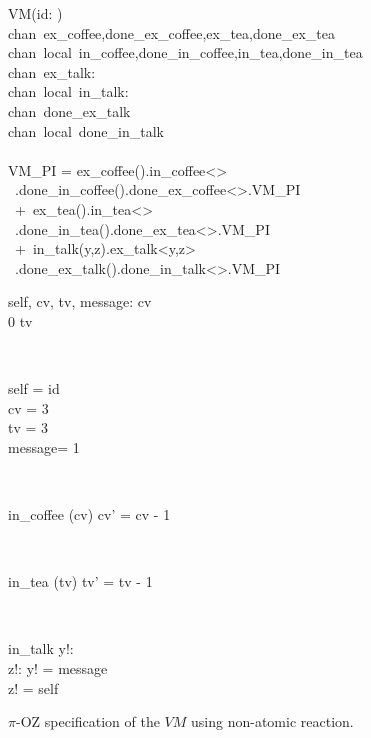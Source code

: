 \begin{figure}[H]
\centering
\begin{class}{VM(id: \integer)}
\ 
\\chan\ ex\_coffee,done\_ex\_coffee,ex\_tea,done\_ex\_tea
\ 
\\chan\ local\ in\_coffee,done\_in\_coffee,in\_tea,done\_in\_tea
\ 
\\chan\ ex\_talk:\integer \times \integer
\ 
\\chan\ local\ in\_talk:\integer \times \integer
\ 
\\chan\ done\_ex\_talk
\ 
\\chan\ local\ done\_in\_talk
\ \\ \
\\VM\_PI = ex\_coffee().in\_coffee<>
\\ \ \qquad \qquad \qquad .done\_in\_coffee().done\_ex\_coffee<>.VM\_PI 
\\ \ \qquad \qquad +\ ex\_tea().in\_tea<>
\\ \ \qquad \qquad \qquad .done\_in\_tea().done\_ex\_tea<>.VM\_PI 
\\ \ \qquad \qquad +\ in\_talk(y,z).ex\_talk<y,z>
\\ \ \qquad \qquad \qquad .done\_ex\_talk().done\_in\_talk<>.VM\_PI
\\
\begin{state}
self, cv, tv, message: \integer
\ST
0 \leq  cv \leq 3
\\
0 \leq  tv \leq 3
\end{state} 
\\
\begin{init}
self = id
\\cv = 3
\\tv = 3
\\ message= 1
\end{init} 
\\
\begin{op}{in\_coffee}
\Delta (cv)
\ST
cv' = cv - 1
\end{op}
\\
\begin{op}{in\_tea}
\Delta (tv)
\ST
tv' = tv - 1
\end{op}
\\
\begin{op}{in\_talk}
y!: \integer
\\z!: \integer
\ST
y! = message
\\z! = self
\end{op}
\end{class}
\caption{$\pi$-OZ specification of the $VM$ using non-atomic reaction.}
\label{comp_oz_pi_statefull_vm_non_atomic}
\end{figure}